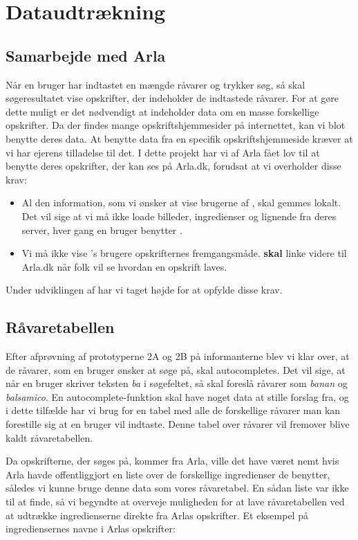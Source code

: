 \section{Dataudtrækning}
\subsection{Samarbejde med Arla}
Når en bruger har indtastet en mængde råvarer og trykker søg, så skal søgeresultatet vise opskrifter, der indeholder de indtastede råvarer. For at gøre dette muligt er det nødvendigt at \Foodl{} indeholder data om en masse forskellige opskrifter. Da der findes mange opskriftshjemmesider på internettet, kan vi blot benytte deres data. At benytte data fra en specifik opskriftshjemmeside kræver at vi har ejerens tilladelse til det. I dette projekt har vi af Arla fået lov til at benytte deres opskrifter, der kan ses på Arla.dk, forudsat at vi overholder disse krav:
\begin{itemize}
\item Al den information, som vi ønsker at vise brugerne af \Foodl, skal gemmes lokalt. Det vil sige at vi må ikke loade billeder, ingredienser og lignende fra deres server, hver gang en bruger benytter \Foodl.
\item Vi må ikke vise \Foodl{}'s brugere opskrifternes fremgangsmåde. \Foodl{} \textbf{skal} linke videre til Arla.dk når folk vil se hvordan en opskrift laves.
\end{itemize}
Under udviklingen af \Foodl{} har vi taget højde for at opfylde disse krav.

\subsection{Råvaretabellen}
Efter afprøvning af prototyperne 2A og 2B på informanterne blev vi klar over, at de råvarer, som en bruger ønsker at søge på, skal autocompletes. Det vil sige, at når en bruger skriver teksten \textit{ba} i søgefeltet, så skal \Foodl{} foreslå råvarer som \fx \textit{banan} og \textit{balsamico}.
En autocomplete-funktion skal have noget data at stille forslag fra, og i dette tilfælde har vi brug for en tabel med alle de forskellige råvarer man kan forestille sig at en bruger vil indtaste. Denne tabel over råvarer vil fremover blive kaldt råvaretabellen.

Da opskrifterne, der søges på, kommer fra Arla, ville det have været nemt hvis Arla havde offentliggjort en liste over de forskellige ingredienser de benytter, således vi kunne bruge denne data som vores råvaretabel. En sådan liste var ikke til at finde, så vi begyndte at overveje muligheden for at lave råvaretabellen ved at udtrække ingredienserne direkte fra Arlas opskrifter. Et eksempel på ingrediensernes navne i Arlas opskrifter:

